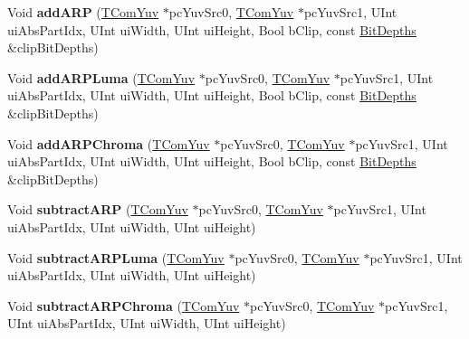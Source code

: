 \begin{DoxyCompactItemize}
\item 
\mbox{\label{class_t_com_yuv_a424b1252438cb26d08ba7366c1f609d4}} 
Void {\bfseries add\+A\+RP} (\hyperlink{class_t_com_yuv}{T\+Com\+Yuv} $\ast$pc\+Yuv\+Src0, \hyperlink{class_t_com_yuv}{T\+Com\+Yuv} $\ast$pc\+Yuv\+Src1, U\+Int ui\+Abs\+Part\+Idx, U\+Int ui\+Width, U\+Int ui\+Height, Bool b\+Clip, const \hyperlink{struct_bit_depths}{Bit\+Depths} \&clip\+Bit\+Depths)
\item 
\mbox{\label{class_t_com_yuv_a6a283390c7cafbfdc82f31e026a19958}} 
Void {\bfseries add\+A\+R\+P\+Luma} (\hyperlink{class_t_com_yuv}{T\+Com\+Yuv} $\ast$pc\+Yuv\+Src0, \hyperlink{class_t_com_yuv}{T\+Com\+Yuv} $\ast$pc\+Yuv\+Src1, U\+Int ui\+Abs\+Part\+Idx, U\+Int ui\+Width, U\+Int ui\+Height, Bool b\+Clip, const \hyperlink{struct_bit_depths}{Bit\+Depths} \&clip\+Bit\+Depths)
\item 
\mbox{\label{class_t_com_yuv_a96160e45a5e127f66fa106723f1550cd}} 
Void {\bfseries add\+A\+R\+P\+Chroma} (\hyperlink{class_t_com_yuv}{T\+Com\+Yuv} $\ast$pc\+Yuv\+Src0, \hyperlink{class_t_com_yuv}{T\+Com\+Yuv} $\ast$pc\+Yuv\+Src1, U\+Int ui\+Abs\+Part\+Idx, U\+Int ui\+Width, U\+Int ui\+Height, Bool b\+Clip, const \hyperlink{struct_bit_depths}{Bit\+Depths} \&clip\+Bit\+Depths)
\item 
\mbox{\label{class_t_com_yuv_a59525a55ca2e3ef18f3858ae7f3c5b99}} 
Void {\bfseries subtract\+A\+RP} (\hyperlink{class_t_com_yuv}{T\+Com\+Yuv} $\ast$pc\+Yuv\+Src0, \hyperlink{class_t_com_yuv}{T\+Com\+Yuv} $\ast$pc\+Yuv\+Src1, U\+Int ui\+Abs\+Part\+Idx, U\+Int ui\+Width, U\+Int ui\+Height)
\item 
\mbox{\label{class_t_com_yuv_a2c953c6cdb4e7ac194c3aba77b8e8fff}} 
Void {\bfseries subtract\+A\+R\+P\+Luma} (\hyperlink{class_t_com_yuv}{T\+Com\+Yuv} $\ast$pc\+Yuv\+Src0, \hyperlink{class_t_com_yuv}{T\+Com\+Yuv} $\ast$pc\+Yuv\+Src1, U\+Int ui\+Abs\+Part\+Idx, U\+Int ui\+Width, U\+Int ui\+Height)
\item 
\mbox{\label{class_t_com_yuv_a7cf10b3c078977edc9152caba7014c94}} 
Void {\bfseries subtract\+A\+R\+P\+Chroma} (\hyperlink{class_t_com_yuv}{T\+Com\+Yuv} $\ast$pc\+Yuv\+Src0, \hyperlink{class_t_com_yuv}{T\+Com\+Yuv} $\ast$pc\+Yuv\+Src1, U\+Int ui\+Abs\+Part\+Idx, U\+Int ui\+Width, U\+Int ui\+Height)

\end{DoxyCompactItemize}
